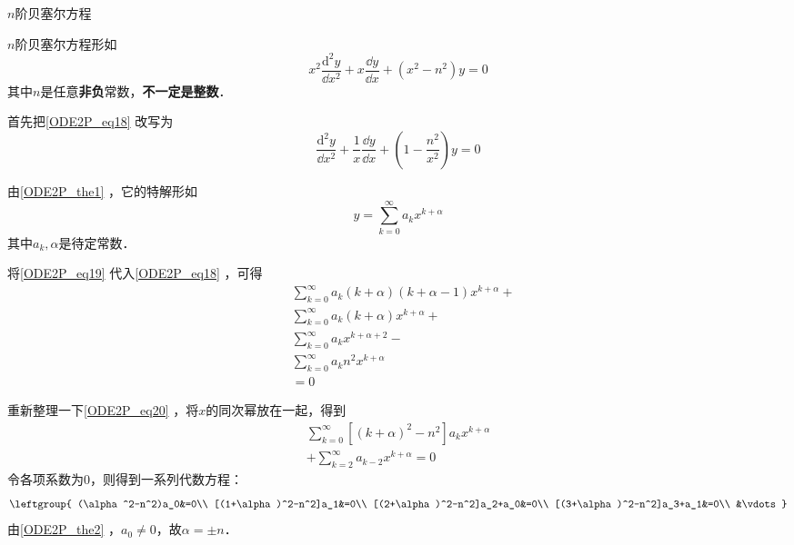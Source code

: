 




\begin{example}{$n$阶贝塞尔方程}\label{ODE2P_ex4}

$n$阶贝塞尔方程形如
\begin{equation}\label{ODE2P_eq18}
x^2\frac{\mathrm{d}^2 y}{\dd x^2}+x\frac{\dd y}{\dd x}+(x^2-n^2)y=0
\end{equation}
其中$n$是任意\textbf{非负}常数，\textbf{不一定是整数}．

首先把\autoref{ODE2P_eq18} 改写为
\begin{equation}
\frac{\mathrm{d}^2 y}{\dd x^2}+\frac{1}{x}\frac{\dd y}{\dd x}+(1-\frac{n^2}{x^2})y=0
\end{equation}

由\autoref{ODE2P_the1} ，它的特解形如
\begin{equation}\label{ODE2P_eq19}
y=\sum\limits_{k=0}^\infty a_kx^{k+\alpha}
\end{equation}
其中$a_k, \alpha$是待定常数．

将\autoref{ODE2P_eq19} 代入\autoref{ODE2P_eq18} ，可得
\begin{equation}\label{ODE2P_eq20}
\begin{aligned}
&\sum\limits^\infty_{k=0}a_k(k+\alpha)(k+\alpha-1)x^{k+\alpha}+\\
&\sum\limits^\infty_{k=0}a_k(k+\alpha)x^{k+\alpha}+\\
&\sum\limits^\infty_{k=0}a_kx^{k+\alpha+2}-\\
&\sum\limits^\infty_{k=0}a_kn^2x^{k+\alpha}\\
&=0
\end{aligned}
\end{equation}

重新整理一下\autoref{ODE2P_eq20} ，将$x$的同次幂放在一起，得到
\begin{equation}
\begin{aligned}
\sum\limits^\infty_{k=0}[(k+\alpha)^2-n^2]a_kx^{k+\alpha}\\
+\sum\limits^\infty_{k=2}a_{k-2}x^{k+\alpha}=0
\end{aligned}
\end{equation}
令各项系数为$0$，则得到一系列代数方程：
\begin{equation}\label{ODE2P_eq21}
\leftgroup{
    (\alpha^2-n^2)a_0&=0\\
    [(1+\alpha)^2-n^2]a_1&=0\\
    [(2+\alpha)^2-n^2]a_2+a_0&=0\\
    [(3+\alpha)^2-n^2]a_3+a_1&=0\\
    &\vdots
}
\end{equation}
由\autoref{ODE2P_the2} ，$a_0\neq 0$，故$\alpha=\pm n$．


\end{example}
